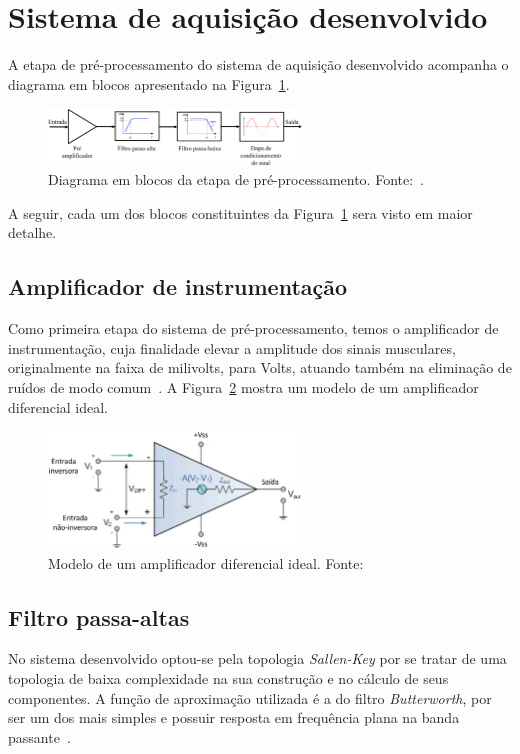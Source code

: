 \documentclass[a4paper,11pt]{article}
\begin{document}
\section{Sistema de aquisição desenvolvido}
\label{sec:sist}
A etapa de pré-processamento do sistema de aquisição desenvolvido acompanha o diagrama em blocos apresentado na Figura~\ref{fig:blocogenerico}.

\begin{figure}[h] 
  \centering
  \includegraphics[width=0.6\textwidth]{fig/diagrama_de_blocos_generico}
	\caption{Diagrama em blocos da etapa de pré-processamento. Fonte:~\parencite{limajr2019}.}
  \label{fig:blocogenerico}
\end{figure}

A seguir, cada um dos blocos constituintes da Figura~\ref{fig:blocogenerico} sera visto em maior detalhe.
	
\subsection{Amplificador de instrumentação}
\label{ssec:ampl}
Como primeira etapa do sistema de pré-processamento, temos o amplificador de instrumentação, cuja finalidade elevar a amplitude dos sinais musculares, originalmente na faixa de milivolts, para Volts, atuando também na eliminação de ruídos de modo comum~\parencite{DELUCA2002}. A Figura~\ref{fig:op_amp} mostra um modelo de um amplificador diferencial ideal.
\begin{figure}[h]
  \centering
  \includegraphics[width=0.6\textwidth]{fig/op_amp}
  \caption{Modelo de um amplificador diferencial ideal. Fonte:~\parencite{ELETRONICS2019}}
  \label{fig:op_amp}
\end{figure}

\subsection{Filtro passa-altas}
\label{ssec:hp}
No sistema desenvolvido optou-se pela topologia \textit{Sallen-Key} por se tratar de uma topologia de baixa complexidade na sua construção e no cálculo de seus componentes. A função de aproximação utilizada é a do filtro \textit{Butterworth}, por ser um dos mais simples e possuir resposta em frequência plana na banda passante~\parencite{BUTTERWORTH}.
\end{document}
